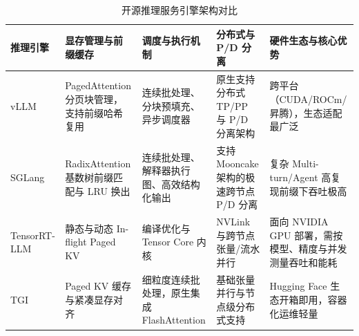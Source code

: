 \documentclass[../textbook.tex]{subfiles}
\begin{document}
\begin{table}[htbp]
\centering
\caption{开源推理服务引擎架构对比}\label{tab:serving-engines}
\begin{tabularx}{\linewidth}{@{}lXXXX@{}}
\toprule
推理引擎 & 显存管理与前缀缓存 & 调度与执行机制 & 分布式与 P/D 分离 & 硬件生态与核心优势 \\
\midrule
vLLM & PagedAttention 分页块管理，支持前缀哈希复用 & 连续批处理、分块预填充、异步调度器 & 原生支持分布式 TP/PP 与 P/D 分离架构 & 跨平台（CUDA/ROCm/昇腾），生态适配最广泛 \\
SGLang & RadixAttention 基数树前缀匹配与 LRU 换出 & 连续批处理、解释器执行图、高效结构化输出 & 支持 Mooncake 架构的极速跨节点 P/D 分离 & 复杂 Multi-turn/Agent 高复现前缀下吞吐极高 \\
TensorRT-LLM & 静态与动态 In-flight Paged KV & 编译优化与 Tensor Core 内核 & NVLink 与跨节点张量/流水并行 & 面向 NVIDIA GPU 部署，需按模型、精度与并发测量吞吐和能耗 \\
TGI & Paged KV 缓存与紧凑显存对齐 & 细粒度连续批处理，原生集成 FlashAttention & 基础张量并行与节点级分布式支持 & Hugging Face 生态开箱即用，容器化运维轻量 \\
\bottomrule
\end{tabularx}
\end{table}

\chapterreferences
\myendchapterdocument
\end{document}
